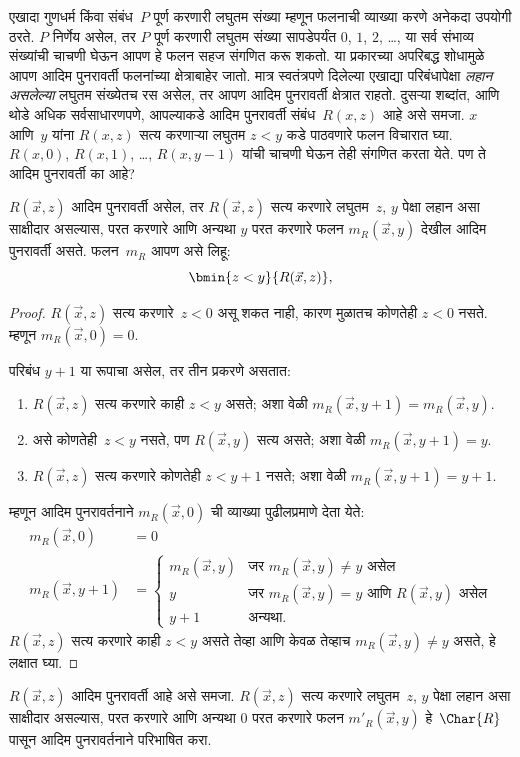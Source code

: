 \documentclass[../../../include/open-logic-section]{subfiles}
\begin{document}

\begin{explain}
एखादा गुणधर्म किंवा संबंध~$P$ पूर्ण करणारी लघुतम संख्या म्हणून फलनाची
व्याख्या करणे अनेकदा उपयोगी ठरते. $P$ निर्णेय असेल, तर $P$ पूर्ण करणारी
लघुतम संख्या सापडेपर्यंत $0$, $1$, $2$, \dots, या सर्व संभाव्य संख्यांची
चाचणी घेऊन आपण हे फलन सहज संगणित करू शकतो. या प्रकारच्या अपरिबद्ध
शोधामुळे आपण आदिम पुनरावर्ती फलनांच्या क्षेत्राबाहेर जातो. मात्र स्वतंत्रपणे
दिलेल्या एखाद्या परिबंधापेक्षा \emph{लहान असलेल्या} लघुतम संख्येतच रस
असेल, तर आपण आदिम पुनरावर्ती क्षेत्रात राहतो. दुसऱ्या शब्दांत, आणि थोडे
अधिक सर्वसाधारणपणे, आपल्याकडे आदिम पुनरावर्ती संबंध~$R(x,z)$ आहे असे
समजा. $x$ आणि~$y$ यांना $R(x, z)$ सत्य करणाऱ्या लघुतम $z < y$ कडे
पाठवणारे फलन विचारात घ्या. $R(x, 0)$, $R(x, 1)$, \dots,
$R(x, y-1)$ यांची चाचणी घेऊन तेही संगणित करता येते. पण ते आदिम
पुनरावर्ती का आहे?
\end{explain}

\begin{prop}
$R(\vec x, z)$ आदिम पुनरावर्ती असेल, तर $R(\vec x, z)$ सत्य करणारे
लघुतम~$z$, $y$ पेक्षा लहान असा साक्षीदार असल्यास, परत करणारे आणि अन्यथा
$y$ परत करणारे फलन $m_R(\vec{x}, y)$ देखील आदिम पुनरावर्ती असते.
फलन~$m_R$ आपण असे लिहू:
\[
\bmin{z < y}{R(\vec{x}, z)},
\]
\end{prop}

\begin{proof}
$R(\vec{x}, z)$ सत्य करणारे~$z < 0$ असू शकत नाही, कारण मुळातच कोणतेही
$z < 0$ नसते. म्हणून $m_R(\vec x, 0) = 0$.

परिबंध $y + 1$ या रूपाचा असेल, तर तीन प्रकरणे असतात:
\begin{enumerate}
\item $R(\vec{x}, z)$ सत्य करणारे काही $z < y$ असते; अशा वेळी
$m_R(\vec{x}, y+1) = m_R(\vec{x}, y)$.
\item असे कोणतेही~$z<y$ नसते, पण $R(\vec{x}, y)$ सत्य असते; अशा वेळी
$m_R(\vec{x}, y+1) = y$.
\item $R(\vec{x}, z)$ सत्य करणारे कोणतेही $z < y+1$ नसते; अशा वेळी
$m_R(\vec{x}, y+1) = y+1$.
\end{enumerate}
म्हणून आदिम पुनरावर्तनाने $m_R(\vec x, 0)$ ची व्याख्या पुढीलप्रमाणे
देता येते:
\begin{align*}
m_R(\vec{x}, 0) & = 0\\
m_R(\vec{x}, y+1) & =
\begin{cases}
m_R(\vec{x}, y) & \text{जर $m_R(\vec x, y) \neq y$ असेल}\\
y & \text{जर $m_R(\vec x, y) = y$ आणि $R(\vec{x}, y)$ असेल}\\
y+1 & \text{अन्यथा.}
\end{cases}
\end{align*}
$R(\vec x, z)$ सत्य करणारे काही $z<y$ असते तेव्हा आणि केवळ तेव्हाच
$m_R(\vec x, y) \neq y$ असते, हे लक्षात घ्या.
\end{proof}

\begin{prob}
$R(\vec x, z)$ आदिम पुनरावर्ती आहे असे समजा. $R(\vec{x}, z)$ सत्य
करणारे लघुतम~$z$, $y$ पेक्षा लहान असा साक्षीदार असल्यास, परत करणारे आणि
अन्यथा $0$ परत करणारे फलन $m'_R(\vec{x}, y)$ हे~$\Char{R}$ पासून
आदिम पुनरावर्तनाने परिभाषित करा.
\end{prob}
\end{document}
